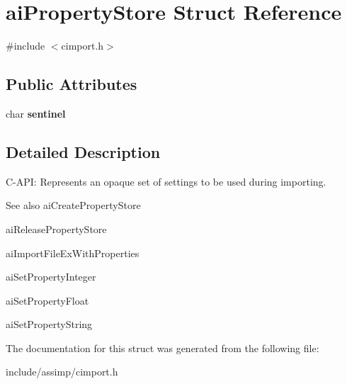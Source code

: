 \hypertarget{structaiPropertyStore}{\section{ai\-Property\-Store \-Struct \-Reference}
\label{structaiPropertyStore}
}


{\ttfamily \#include $<$cimport.\-h$>$}

\subsection*{\-Public \-Attributes}
\begin{DoxyCompactItemize}
\item 
\hypertarget{structaiPropertyStore_a53e97983bdbe38c596c7879555dc42a3}{char {\bfseries sentinel}}\label{structaiPropertyStore_a53e97983bdbe38c596c7879555dc42a3}

\end{DoxyCompactItemize}


\subsection{\-Detailed \-Description}
\-C-\/\-A\-P\-I\-: \-Represents an opaque set of settings to be used during importing. \begin{DoxySeeAlso}{\-See also}
ai\-Create\-Property\-Store 

ai\-Release\-Property\-Store 

ai\-Import\-File\-Ex\-With\-Properties 

ai\-Set\-Property\-Integer 

ai\-Set\-Property\-Float 

ai\-Set\-Property\-String 
\end{DoxySeeAlso}


\-The documentation for this struct was generated from the following file\-:\begin{DoxyCompactItemize}
\item 
include/assimp/cimport.\-h\end{DoxyCompactItemize}
